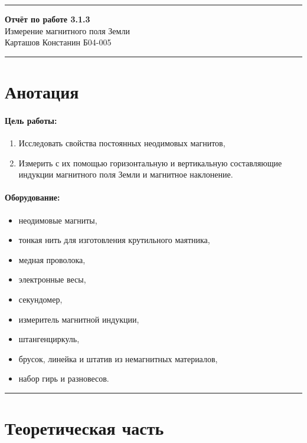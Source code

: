 \documentclass[a4paper,12pt]{article} %
\begin{document}

\hrule 	
\medskip
\begin{raggedright}
{\large \textbf{Отчёт по работе 3.1.3}}
\\
\medskip
{\Large Измерение магнитного поля Земли} 
\\
\medskip
{\large Карташов Констанин Б04-005}
\medskip
\hrule
\medskip
\end{raggedright}


\section{Анотация}

\paragraph{Цель работы:} 
\begin{enumerate}
\itemsep0em
\item Исследовать свойства постоянных неодимовых магнитов, 
\item Измерить с их помощью горизонтальную и вертикальную составляющие индукции
магнитного поля Земли и магнитное наклонение.
\end{enumerate}

\paragraph{Оборудование:}
\begin{itemize}
\renewcommand{\labelitemi}{$\triangleright$}
\itemsep0em
\item неодимовые магниты,
\item тонкая нить для изготовления крутильного маятника,
\item медная проволока,
\item электронные весы,
\item секундомер,
\item измеритель магнитной индукции,
\item штангенциркуль,
\item брусок, линейка и штатив из немагнитных материалов,
\item набор гирь и разновесов.
\end{itemize}


\medskip\hrule\medskip

\section{Теоретическая часть}
\end{document}
